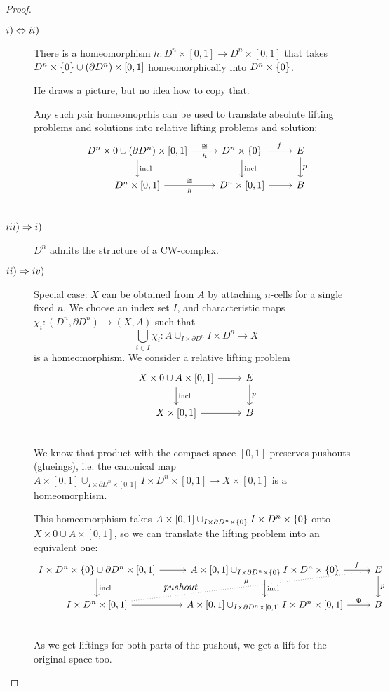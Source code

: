 \documentclass[language=english]{TemplateLecture}
\begin{document}
\begin{proof}
    \begin{description}
        \item[\(i) \Leftrightarrow ii)\)] There is a homeomorphism \(h \colon D^n \times [0,1] \to D^n \times[0,1]\) that takes \(D^n \times \{0\} \cup (\partial D^n)\times [0,1]\) homeomorphically into \(D^n \times \{0\}\).
        
        He draws a picture, but no idea how to copy that.

        Any such pair homeomoprhis can be used to translate absolute lifting problems and solutions into relative lifting problems and solution:
        \[\begin{tikzcd}
            D^n \times 0 \cup (\partial D^n) \times [0,1] \ar[r, "\cong", "h"'] \ar[d, "\incl"] & D^n \times \set 0 \ar[d, "\incl"] \ar[r, "f"] & E \ar[d, "p"] \\
            D^n \times [0,1] \ar[r, "\cong", "h"'] & D^n \times [0,1] \ar[r] & B \\
        \end{tikzcd}\]

        \item[\(iii) \Rightarrow i)\)] \(D^n\) admits the structure of a CW-complex.
        \item[\(ii) \Rightarrow iv)\)] Special case: \(X\) can be obtained from \(A\) by attaching \(n\)-cells for a single fixed \(n\). We choose an index set \(I\), and characteristic maps \(\chi_i \colon (D^n, \partial D^n) \to (X,A)\) such that
        \[\bigcup_{i \in I} \chi_i \colon A \cup_{I \times \partial D^n} I \times D^n \to X\]
        is a homeomorphism. We consider a relative lifting problem
        \[\begin{tikzcd}
            X \times 0 \cup A \times [0,1] \ar[d, "\incl"] \ar[r] & E \ar[d, "p"]\\
            X \times [0,1] \ar[r] & B \\
        \end{tikzcd}\]
        We know that product with the compact space \([0,1]\) preserves pushouts (glueings), i.e. the canonical map \(A \times [0,1] \cup_{I \times \partial D^n \times [0,1]} I \times D^n \times [0,1] \to X \times [0,1]\) is a homeomorphism.

        This homeomorphism takes \(A \times [0,1] \cup_{I \times \partial D^n \times \{0\}} I \times D^n \times \{0\}\) onto \(X \times 0 \cup A \times [0,1]\), so we can translate the lifting problem into an equivalent one:
        \[\begin{tikzcd}
            I \times D^n \times \set 0 \cup \partial D^n \times [0,1] \ar[dr, phantom, "pushout"] \ar[d, "\incl"] \ar[r] & A \times [0,1] \cup_{I \times \partial D^n \times \set 0} I \times D^n \times \set 0 \ar[d, "\incl"] \ar[r, "f"] & E \ar[d, "p"] \\
            I \times D^n \times [0,1] \ar[rru, "\mu", dotted] \ar[r] & A \times [0,1] \cup_{I \times \partial D^n \times [0,1]} I \times D^n \times [0,1] \ar[r, "\Psi"] & B \\
        \end{tikzcd}\]
        As we get liftings for both parts of the pushout, we get a lift for the original space too.


\end{description}
\end{proof}
\end{document}
